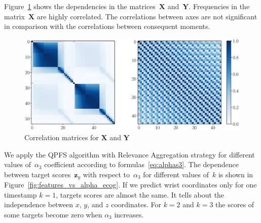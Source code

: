 \documentclass[12pt,twoside]{article}
\theoremstyle{definition}
\newcommand{\bz}{\mathbf{z}}
\newcommand{\bY}{\mathbf{Y}}
\newcommand{\bX}{\mathbf{X}}
\begin{document}
Figure~\ref{fig:corr_matrix} shows the dependencies in the matrices~$\bX$ and~$\bY$. Frequencies in the matrix~$\bX$ are highly correlated.
The correlations between axes are not significant in comparison with the correlations between consequent moments.
\begin{figure}[h]
	\includegraphics[width=\linewidth]{figs/corr_matrix.eps}
	\caption{Correlation matrices for $\bX$ and $\bY$}
	\label{fig:corr_matrix}
\end{figure}

We apply the QPFS algorithm with Relevance Aggregation strategy for different values of~$\alpha_3$ coefficient according to formulas~\eqref{eq:alphas3}.
The dependence between target scores~$\bz_y$ with respect to~$\alpha_3$ for different values of~$k$ is shown in Figure~\ref{fig:features_vs_alpha_ecog}.
If we predict wrist coordinates only for one timestamp $k = 1$, targets scores are almost the same.
It tells about the independence between $x$, $y$, and $z$ coordinates.
For $k = 2$ and $k = 3$ the scores of some targets become zero when $\alpha_3$ increases.
\end{document}
